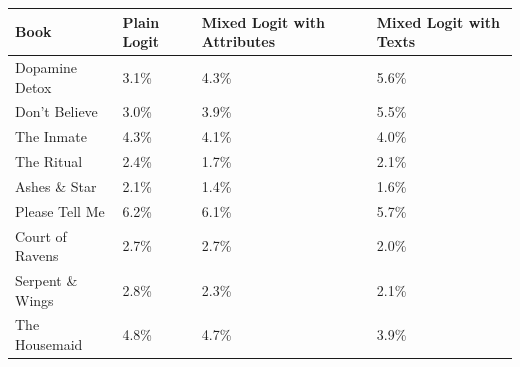 \begin{centering}
\begin{tabular}{>{\raggedright}p{5cm}>{\raggedright}p{2cm}>{\centering}p{2cm}>{\centering}p{2cm}}
\hline
{\footnotesize\textbf{Book}} & {\footnotesize\textbf{Plain Logit}} & {\footnotesize\textbf{Mixed Logit with Attributes}} & {\footnotesize\textbf{Mixed Logit with Texts}}\tabularnewline
\hline
{\footnotesize Dopamine Detox} & {\footnotesize 3.1\%} & {\footnotesize 4.3\%} & {\footnotesize 5.6\%}\tabularnewline
{\footnotesize Don't Believe} & {\footnotesize 3.0\%} & {\footnotesize 3.9\%} & {\footnotesize 5.5\%}\tabularnewline
{\footnotesize The Inmate} & {\footnotesize 4.3\%} & {\footnotesize 4.1\%} & {\footnotesize 4.0\%}\tabularnewline
{\footnotesize The Ritual} & {\footnotesize 2.4\%} & {\footnotesize 1.7\%} & {\footnotesize 2.1\%}\tabularnewline
{\footnotesize Ashes \& Star} & {\footnotesize 2.1\%} & {\footnotesize 1.4\%} & {\footnotesize 1.6\%}\tabularnewline
{\footnotesize Please Tell Me} & {\footnotesize 6.2\%} & {\footnotesize 6.1\%} & {\footnotesize 5.7\%}\tabularnewline
{\footnotesize Court of Ravens} & {\footnotesize 2.7\%} & {\footnotesize 2.7\%} & {\footnotesize 2.0\%}\tabularnewline
{\footnotesize Serpent \& Wings} & {\footnotesize 2.8\%} & {\footnotesize 2.3\%} & {\footnotesize 2.1\%}\tabularnewline
{\footnotesize The Housemaid} & {\footnotesize 4.8\%} & {\footnotesize 4.7\%} & {\footnotesize 3.9\%}\tabularnewline
\hline
\end{tabular}
\par\end{centering}